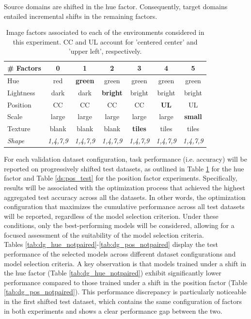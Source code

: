 \begin{dataset} Source domains are shifted in the hue factor. Consequently,
    target domains entailed incremental shifts in the remaining factors.

    \begin{table}[H]
        \centering
        \begin{tabular}{l|c|c|c|c|c|c}
        \# Factors & 0 & 1 & 2 & 3 & 4 & 5 \\
        \midrule
        Hue & red & \textbf{green} & green & green & green & green \\
        Lightness & dark & dark & \textbf{bright} & bright & bright & bright \\
        Position  & CC & CC & CC & CC & \textbf{UL} & UL \\
        Scale  & large & large & large & large & large & \textbf{small} \\
        Texture & blank & blank & blank & \textbf{tiles} & tiles & tiles \\
        \textit{Shape} & \textit{1,4,7,9} &  \textit{1,4,7,9} &  \textit{1,4,7,9} & \textit{1,4,7,9} & \textit{1,4,7,9} & \textit{1,4,7,9} \\
        \bottomrule
        \end{tabular}
        \caption{
        Image factors associated to each of the environments considered in this experiment. CC and UL account
        for 'centered center' and 'upper left', respectively.
        }
        \label{ds:hue_test}
    \end{table}
\end{dataset}

For each validation dataset configuration, task performance (i.e. accuracy) will be reported on 
progressively shifted test datasets, as outlined in Table \ref{ds:hue_test}
for the hue factor and Table \ref{ds:pos_test} for the position factor experiments. Specifically, 
results will be associated with the optimization process that achieved the highest aggregated test accuracy 
across all the datasets. In other words, the optimization configuration that maximizes 
the cumulative performance across all test datasets will be reported, regardless of the 
model selection criterion. Under these conditions, only the best-performing models 
will be considered, allowing for a focused assessment of the suitability of the 
model selection criteria. \\

Tables \ref{tab:dg_hue_notpaired}-\ref{tab:dg_pos_notpaired} display the test performance of the selected 
models across different dataset configurations and model selection criteria. A key observation is that 
models trained under a shift in the hue factor (Table \ref{tab:dg_hue_notpaired}) exhibit significantly 
lower performance compared to those trained under a shift in the position factor (Table \ref{tab:dg_pos_notpaired}).
This performance discrepancy is particularly noticeable in the first shifted test dataset, which contains the same configuration
of factors in both experiments and shows a clear performance gap between the two. \\

